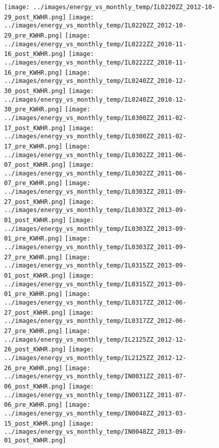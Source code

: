 \clearpage
\begin{figure}
\centering
\texttt{[image: ../images/energy\_vs\_monthly\_temp/IL0220ZZ\_2012-10-29\_post\_KWHR.png]}
\texttt{[image: ../images/energy\_vs\_monthly\_temp/IL0220ZZ\_2012-10-29\_pre\_KWHR.png]}
\texttt{[image: ../images/energy\_vs\_monthly\_temp/IL0222ZZ\_2010-11-16\_post\_KWHR.png]}
\texttt{[image: ../images/energy\_vs\_monthly\_temp/IL0222ZZ\_2010-11-16\_pre\_KWHR.png]}
\texttt{[image: ../images/energy\_vs\_monthly\_temp/IL0240ZZ\_2010-12-30\_post\_KWHR.png]}
\texttt{[image: ../images/energy\_vs\_monthly\_temp/IL0240ZZ\_2010-12-30\_pre\_KWHR.png]}
\texttt{[image: ../images/energy\_vs\_monthly\_temp/IL0300ZZ\_2011-02-17\_post\_KWHR.png]}
\texttt{[image: ../images/energy\_vs\_monthly\_temp/IL0300ZZ\_2011-02-17\_pre\_KWHR.png]}
\texttt{[image: ../images/energy\_vs\_monthly\_temp/IL0302ZZ\_2011-06-07\_post\_KWHR.png]}
\texttt{[image: ../images/energy\_vs\_monthly\_temp/IL0302ZZ\_2011-06-07\_pre\_KWHR.png]}
\texttt{[image: ../images/energy\_vs\_monthly\_temp/IL0303ZZ\_2011-09-27\_post\_KWHR.png]}
\texttt{[image: ../images/energy\_vs\_monthly\_temp/IL0303ZZ\_2013-09-01\_post\_KWHR.png]}
\texttt{[image: ../images/energy\_vs\_monthly\_temp/IL0303ZZ\_2013-09-01\_pre\_KWHR.png]}
\texttt{[image: ../images/energy\_vs\_monthly\_temp/IL0303ZZ\_2011-09-27\_pre\_KWHR.png]}
\texttt{[image: ../images/energy\_vs\_monthly\_temp/IL0315ZZ\_2013-09-01\_post\_KWHR.png]}
\texttt{[image: ../images/energy\_vs\_monthly\_temp/IL0315ZZ\_2013-09-01\_pre\_KWHR.png]}
\texttt{[image: ../images/energy\_vs\_monthly\_temp/IL0317ZZ\_2012-06-27\_post\_KWHR.png]}
\texttt{[image: ../images/energy\_vs\_monthly\_temp/IL0317ZZ\_2012-06-27\_pre\_KWHR.png]}
\texttt{[image: ../images/energy\_vs\_monthly\_temp/IL2125ZZ\_2012-12-26\_post\_KWHR.png]}
\texttt{[image: ../images/energy\_vs\_monthly\_temp/IL2125ZZ\_2012-12-26\_pre\_KWHR.png]}
\texttt{[image: ../images/energy\_vs\_monthly\_temp/IN0031ZZ\_2011-07-06\_post\_KWHR.png]}
\texttt{[image: ../images/energy\_vs\_monthly\_temp/IN0031ZZ\_2011-07-06\_pre\_KWHR.png]}
\texttt{[image: ../images/energy\_vs\_monthly\_temp/IN0048ZZ\_2013-03-15\_post\_KWHR.png]}
\texttt{[image: ../images/energy\_vs\_monthly\_temp/IN0048ZZ\_2013-09-01\_post\_KWHR.png]}
\end{figure}
